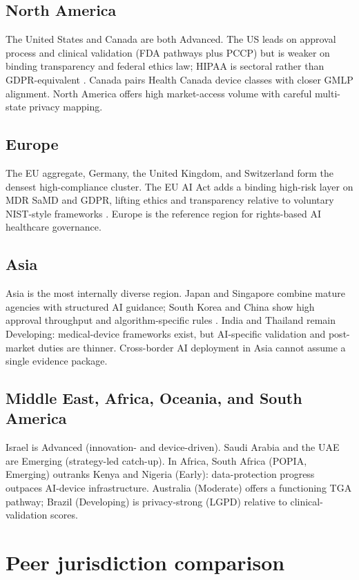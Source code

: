 \documentclass[12pt,a4paper]{report}
\begin{document}
\subsection{North America}
The United States and Canada are both Advanced. The US leads on approval process and clinical validation (FDA pathways plus PCCP) but is weaker on binding transparency and federal ethics law; HIPAA is sectoral rather than GDPR-equivalent \cite{cohen2018}. Canada pairs Health Canada device classes with closer GMLP alignment. North America offers high market-access volume with careful multi-state privacy mapping.

\subsection{Europe}
The EU aggregate, Germany, the United Kingdom, and Switzerland form the densest high-compliance cluster. The EU AI Act adds a binding high-risk layer on MDR SaMD and GDPR, lifting ethics and transparency relative to voluntary NIST-style frameworks \cite{euaiact2024}. Europe is the reference region for rights-based AI healthcare governance.

\subsection{Asia}
Asia is the most internally diverse region. Japan and Singapore combine mature agencies with structured AI guidance; South Korea and China show high approval throughput and algorithm-specific rules \cite{nmpa2021,pmda2020}. India and Thailand remain Developing: medical-device frameworks exist, but AI-specific validation and post-market duties are thinner. Cross-border AI deployment in Asia cannot assume a single evidence package.

\subsection{Middle East, Africa, Oceania, and South America}
Israel is Advanced (innovation- and device-driven). Saudi Arabia and the UAE are Emerging (strategy-led catch-up). In Africa, South Africa (POPIA, Emerging) outranks Kenya and Nigeria (Early): data-protection progress outpaces AI-device infrastructure. Australia (Moderate) offers a functioning TGA pathway; Brazil (Developing) is privacy-strong (LGPD) relative to clinical-validation scores.

\section{Peer jurisdiction comparison}
\end{document}
